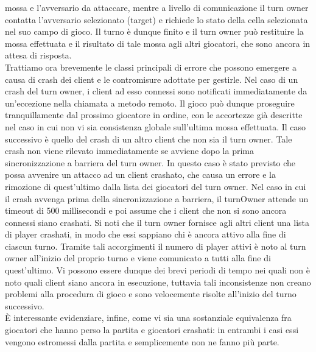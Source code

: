 mossa e l'avversario da attaccare, mentre a livello di comunicazione il turn 
owner contatta l'avversario selezionato (target) e richiede lo stato della 
cella selezionata nel suo campo di gioco. Il turno è dunque finito e il turn 
owner può restituire la mossa effettuata e il risultato di tale mossa agli 
altri giocatori, che sono ancora in attesa di risposta.
\\
Trattiamo ora brevemente le classi principali di errore che possono emergere a 
causa di crash dei client e le contromisure adottate per gestirle. Nel caso di 
un crash del turn owner, i client ad esso connessi sono notificati 
immediatamente da un'eccezione nella chiamata a metodo remoto. Il gioco può 
dunque proseguire tranquillamente dal prossimo giocatore in ordine, con le 
accortezze già descritte nel caso in cui non vi sia consistenza globale 
sull'ultima mossa effettuata. Il caso successivo è quello del crash di un altro 
client che non sia il turn owner. Tale crash non viene rilevato immediatamente 
se avviene dopo la prima sincronizzazione a barriera del turn owner. In questo 
caso è stato previsto che possa avvenire un attacco ad un client crashato, che 
causa un errore e la rimozione di quest'ultimo dalla lista dei giocatori del 
turn owner. Nel caso in cui il crash avvenga prima della sincronizzazione a 
barriera, il turnOwner attende un timeout di 500 %
millisecondi e poi assume che i client che non si sono ancora connessi siano 
crashati. Si noti che il turn owner fornisce agli altri client una lista di 
player crashati, in modo che essi sappiano chi è ancora attivo alla fine di 
ciascun turno. Tramite tali accorgimenti il numero di player attivi è noto al 
turn owner all'inizio del proprio turno e viene comunicato a tutti alla fine di 
quest'ultimo. Vi possono essere dunque dei brevi periodi di tempo nei quali non 
è noto quali client siano ancora in esecuzione, tuttavia tali inconsistenze non 
creano problemi alla procedura di gioco e sono velocemente risolte all'inizio 
del turno successivo.
\\
È interessante evidenziare, infine, come vi sia una sostanziale equivalenza fra 
giocatori che hanno perso la partita e giocatori crashati: in entrambi i casi 
essi vengono estromessi dalla partita e semplicemente non ne fanno più parte.